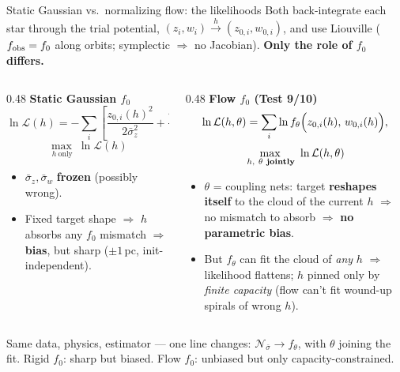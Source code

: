 \documentclass[10pt]{beamer}
\begin{document}
\begin{frame}{Static Gaussian vs.\ normalizing flow: the likelihoods}
\small
Both back-integrate each star through the trial potential,
$(z_i,w_i)\xrightarrow{h}(z_{0,i},w_{0,i})$, and use Liouville
($f_{\rm obs}=f_0$ along orbits; symplectic $\Rightarrow$ no Jacobian).
\textbf{Only the role of $f_0$ differs.}

\vspace{4pt}
\begin{columns}[T]
\begin{column}{0.48\textwidth}
\centering \textbf{Static Gaussian $f_0$}
\[
\ln\mathcal L(h)=
-\sum_i\left[\frac{z_{0,i}(h)^2}{2\bar\sigma_z^2}
            +\frac{w_{0,i}(h)^2}{2\bar\sigma_w^2}\right]+\mathrm{c},
\]
\vspace{-4pt}
\[
\max_{\,h\ \text{only}}\ \ln\mathcal L(h)
\]
\begin{itemize}\scriptsize\setlength\itemsep{1pt}
\item $\bar\sigma_z,\bar\sigma_w$ \textbf{frozen} (possibly wrong).
\item Fixed target shape $\Rightarrow$ $h$ absorbs any $f_0$ mismatch
      $\Rightarrow$ \textbf{bias}, but sharp ($\pm1$\,pc, init-independent).
\end{itemize}
\end{column}
\hfill
\begin{column}{0.48\textwidth}
\centering \textbf{Flow $f_0$ (Test 9/10)}
\[
\ln\mathcal L(h,\theta)=\sum_{i}\ln
f_{\theta}\Bigl(z_{0,i}(h),\,w_{0,i}(h)\Bigr),
\]
\vspace{-4pt}
\[
\max_{\,h,\ \theta\ \text{\textbf{jointly}}}\ \ln\mathcal L(h,\theta)
\]
\begin{itemize}\scriptsize\setlength\itemsep{1pt}
\item $\theta$ = coupling nets: target \textbf{reshapes itself} to the
      cloud of the current $h$ $\Rightarrow$ no mismatch to absorb
      $\Rightarrow$ \textbf{no parametric bias}.
\item But $f_\theta$ can fit the cloud of \emph{any} $h$ $\Rightarrow$
      likelihood flattens; $h$ pinned only by \emph{finite capacity}
      (flow can't fit wound-up spirals of wrong $h$).
\end{itemize}
\end{column}
\end{columns}

\vspace{4pt}
\centering
\colorbox{blue!10}{\parbox{0.94\textwidth}{\centering\scriptsize
Same data, physics, estimator --- one line changes:
$\mathcal N_{\bar\sigma}\to f_\theta$, with $\theta$ joining the fit.\quad
Rigid $f_0$: sharp but biased.\; Flow $f_0$: unbiased but only
capacity-constrained.}}

\end{frame}
\end{document}
